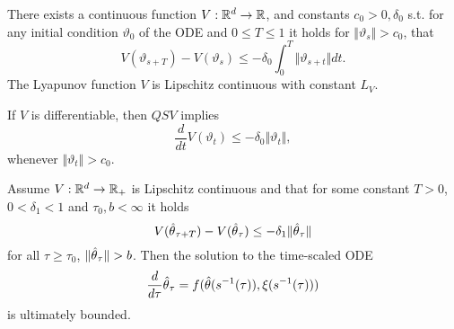 
There exists a continuous function \(V:\mathbb{R}^d\to\mathbb{R}\), and constants
\(c_0>0,\delta_0\) s.t. for any initial condition \(\vartheta_0\) of the ODE 
and \(0\leq T\leq 1\) it holds for \(\Vert \vartheta_s\Vert>c_0\), that 
\[V(\vartheta_{s+T})-V(\vartheta_s)\leq -\delta_0\int_0^T\Vert  \vartheta_{s+t}\Vert dt.\]
The Lyapunov function \(V\) is Lipschitz continuous with constant \(L_V\).  


If \(V\) is differentiable, then \(QSV\) implies 
\[\frac{d}{dt}V(\vartheta_t)\leq -\delta_0\Vert \vartheta_t\Vert,\]
whenever \(\Vert \vartheta_t\Vert >c_0\).
\begin{lemma}\label{lem:43}
    Assume \(V:\mathbb{R}^d\to\mathbb{R}_+\) is Lipschitz continuous and that for some constant \(T>0\),
    \(0<\delta_1<1\) and \(\tau_0,b<\infty\) it holds 
    \[V({\hat{\theta}}_{\tau+T})-V({\hat{\theta}}_\tau)\leq -\delta_1\Vert {\hat{\theta}}_\tau\Vert\]
    for all \(\tau\geq \tau_0\), \(\Vert{\hat{\theta}}_\tau\Vert>b\). Then the solution 
    to the time-scaled ODE 
    \begin{equation}\label{eq:ts-ode}
        \frac{d}{d\tau} {\hat{\theta}}_\tau = f({\hat{\theta}}(s^{-1}(\tau)),\xi(s^{-1}(\tau)))
    \end{equation}
    is ultimately bounded. 
\end{lemma}

